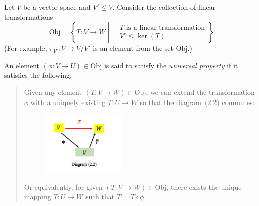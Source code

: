 \begin{definition}
Let $V$ be a vector space and $V'\le V$. Consider the collection of linear transformations
\[
\text{Obj}=\left\{T:V\to W\middle| 
\begin{aligned}
&\text{$T$ is a linear transformation}\\
&V'\le\ker(T)
\end{aligned}
\right\}
\]
(For example, $\pi_{V'}:V\to V/ V'$ is an element from the set $\text{Obj}$.)

An element $(\phi: V\to U)\in\text{Obj}$ is said to satisfy the \emph{universal property} if it satisfies the following:
\begin{quotation}
Given any element $(T:V\to W)\in\text{Obj}$, 
we can extend the transformation $\phi$ with a uniquely existing $\tilde{T}:U\to W$ so that the diagram~(2.2) commutes:
\begin{figure}[H]
\centering
\includegraphics[width=0.4\textwidth]{week4/p_3}
\end{figure}
Or equivalently, for given $(T:V\to W)\in\text{Obj}$, there exists the unique mapping $\tilde{T}:U\to W$ such that $T=\tilde{T}\circ\phi$.
\end{quotation}
\end{definition}


